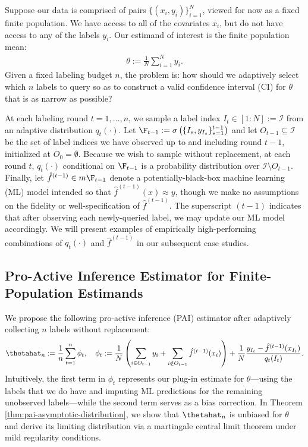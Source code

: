 \documentclass[11pt]{article}
\begin{document}
Suppose our data is comprised of pairs $\{ (x_i, y_i) \}_{i=1}^N$, viewed for now as a fixed finite population. We have access to all of the covariates $x_i$, but do not have access to any of the labels $y_i$. Our estimand of interest is the finite population mean:
\begin{align}
    \theta := \frac{1}{N} \sum_{i=1}^N y_i.
\end{align}
Given a fixed labeling budget $n$, the problem is: how should we adaptively select which $n$ labels to query so as to construct a valid confidence interval (CI) for $\theta$ that is as narrow as possible?

At each labeling round $t = 1, \dots, n$, we sample a label index $I_t \in [1:N] := \mathcal{I}$ from an adaptive distribution $q_t(\cdot)$. Let $\F_{t-1} := \sigma\left( \{ I_s, y_{I_s}\}_{s=1}^{t-1} \right)$ and let $O_{t-1} \subseteq \mathcal{I}$ be the set of label indices we have observed up to and including round $t-1$, initialized at $O_0 = \emptyset$. Because we wish to sample without replacement, at each round $t$, $q_t(\cdot)$ conditional on $\F_{t-1}$ is a probability distribution over $\mathcal{I} \setminus O_{t-1}$. Finally, let $\hat{f}^{(t-1)} \in m\F_{t-1}$ denote a potentially-black-box machine learning (ML) model intended so that $\hat{f}^{(t-1)}(x) \approx y$, though we make no assumptions on the fidelity or well-specification of $\hat{f}^{(t-1)}$. The superscript $(t-1)$ indicates that after observing each newly-queried label, we may update our ML model accordingly. We will present examples of empirically high-performing combinations of $q_t(\cdot)$ and $\hat{f}^{(t-1)}$ in our subsequent case studies.

\subsection{Pro-Active Inference Estimator for Finite-Population Estimands}

We propose the following pro-active inference (PAI) estimator after adaptively collecting $n$ labels without replacement:
\begin{align}
    \thetahat_{n} := \frac{1}{n}\sum_{t=1}^n \phi_t, \quad \phi_t := \frac{1}{N}\left( \sum_{i \in O_{t-1}} y_i + \sum_{i \notin O_{t-1}} \hat{f}^{(t-1)}(x_{i}) \right) + \frac{1}{N}\frac{y_{I_t} - \hat{f}^{(t-1)}(x_{I_t})}{q_t(I_t)}.
\end{align}
Intuitively, the first term in $\phi_t$ represents our plug-in estimate for $\theta$---using the labels that we do have and imputing ML predictions for the remaining unobserved labels---while the second term serves as a bias correction. In Theorem \ref{thm:pai-asymptotic-distribution}, we show that $\thetahat_n$ is unbiased for $\theta$ and derive its limiting distribution via a martingale central limit theorem under mild regularity conditions.
\end{document}
